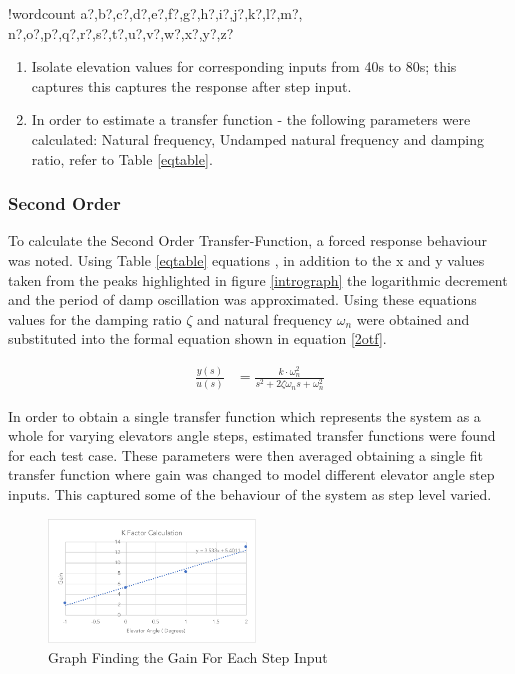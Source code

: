\documentclass[11pt]{article}
\newcounter{words}
\newenvironment{counted}{%
  \setcounter{words}{0}
  \SearchList!{wordcount}{\stepcounter{words}}
    {a?,b?,c?,d?,e?,f?,g?,h?,i?,j?,k?,l?,m?,
    n?,o?,p?,q?,r?,s?,t?,u?,v?,w?,x?,y?,z?}
  \UndoBoundary{'}
  \SearchOrder{p;}}{%
  \StopSearching}
\begin{document}
\begin{counted}
\begin{enumerate}

\item
  Isolate elevation values for corresponding inputs from 40s to 80s;
  this captures this captures the response after step input.
\item
  In order to estimate a transfer function - the following parameters
  were calculated: Natural frequency, Undamped natural frequency and
  damping ratio, refer to Table \ref{eqtable}.
\end{enumerate}

\subsubsection{Second Order}\label{second-order}

To calculate the Second Order Transfer-Function, a forced response
behaviour was noted. Using Table \ref{eqtable} equations \cite{vibnote}
\cite{vibnote2}, in addition to the x and y values taken from the peaks
highlighted in figure \ref{intrograph} the logarithmic decrement and the
period of damp oscillation was approximated. Using these equations
values for the damping ratio \(\zeta\) and natural frequency
\(\omega_n\) were obtained and substituted into the formal equation
shown in equation \ref{2otf}.

\begin{align}
\frac{ y(s) }{ u(s) } &=\frac{ k\cdot \omega_{ n }^{ 2 } }{ s^{ 2 }+2\zeta \omega_{ n }s+\omega_{ n }^{ 2 } }
\label{2otsf}
\end{align}

In order to obtain a single transfer function which represents the
system as a whole for varying elevators angle steps, estimated transfer
functions were found for each test case. These parameters were then
averaged obtaining a single fit transfer function where gain was changed
to model different elevator angle step inputs. This captured some of the
behaviour of the system as step level varied.

\begin{figure}
  \begin{center}
  \vspace{0pt}
\includegraphics[trim = 10 10 10 10, clip, width=0.49\textwidth]{kgraph.pdf}  
\end{center}
\caption{Graph Finding the Gain For Each Step Input}
\label{kgraph}
  \vspace{0pt}
\end{figure}


\end{counted}
\end{document}
